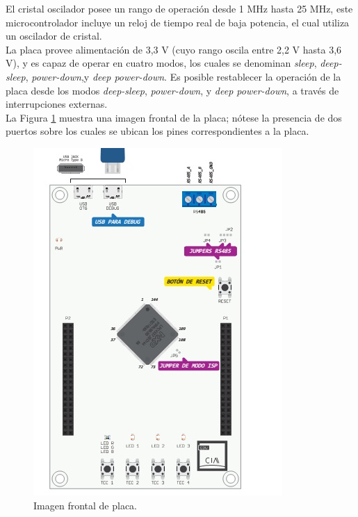 \documentclass[12pt,letterpaper]{article}
\begin{document}
El cristal oscilador posee un rango de operación desde 1 MHz hasta 25 MHz, este microcontrolador incluye un reloj de tiempo real de baja potencia, el cual utiliza un oscilador de cristal.
  \\

La placa provee alimentación de 3,3 V (cuyo rango oscila entre 2,2 V hasta 3,6 V), y es capaz de operar en cuatro modos, los cuales se denominan \textit{sleep}, \textit{deep-sleep}, \textit{power-down},y \textit{deep power-down}. Es posible restablecer la operación de la placa desde los modos \textit{deep-sleep}, \textit{power-down}, y \textit{deep power-down}, a través de interrupciones externas.
 \\
 
La Figura  \ref{Fig2} muestra  una imagen frontal de la placa; nótese la presencia de dos puertos sobre los cuales se ubican los pines correspondientes a la placa.

\begin{figure}[H]
\centering
\includegraphics[width=6 cm]{figuras/FIGURA_1.jpg}
\caption{Imagen frontal de placa.}
\label{Fig2}
\end{figure}
 
\end{document}
